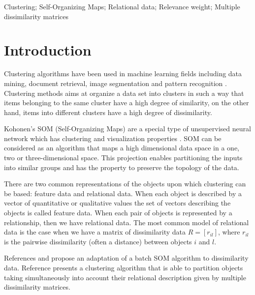 \documentclass[10pt, conference, compsocconf]{IEEEtran}
\begin{document}
\begin{IEEEkeywords}
Clustering; Self-Organizing Maps; Relational data; Relevance weight; Multiple dissimilarity matrices

\end{IEEEkeywords}


%
\IEEEpeerreviewmaketitle



\section{Introduction}
Clustering algorithms have been used in machine learning fields including data mining, document retrieval, image segmentation and pattern recognition \cite{Jain:1999}. Clustering methods aims at organize a data set into clusters in such a way that items belonging to the same cluster have a high degree of similarity, on the other hand, items into different clusters have a high degree of dissimilarity.

Kohonen's SOM (Self-Organizing Maps) \cite{Kohonen:1990} are a special type of unsupervised neural network which has clustering and visualization properties \cite{Gopalakrishnan:2008}. SOM can be considered as an algorithm that maps a  high dimensional data space in a one, two or three-dimensional space. This projection enables partitioning the inputs into similar groups and has the property to preserve the topology of the data.

There are two common representations of the objects upon which clustering can be based: feature data and relational data. When each object is described by a vector of quantitative or qualitative values the set of vectors describing the objects is called feature data. When each pair of objects is represented by a relationship, then we have relational data. The most common model of relational data is the case when we have a matrix of dissimilarity data $R = [r_{il}]$, where $r_{il}$ is the pairwise dissimilarity (often a distance) between objects $i$ and $l$.

References \cite{golli:2004} and \cite{Conan-Guez:2006} propose an adaptation of a batch SOM algorithm to dissimilarity data. Reference \cite{DeCarvalho:2011} presents a clustering algorithm that is able to partition objects taking simultaneously into account their relational description given by multiple dissimilarity matrices.
\end{document}
